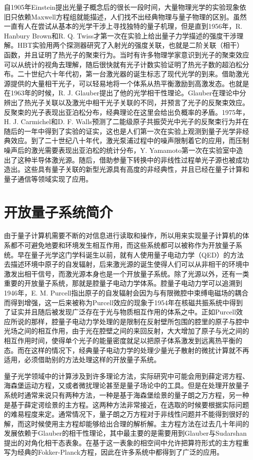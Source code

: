 自1905年Einstein提出光量子概念后的很长一段时间，大量物理光学的实验现象依旧只依赖Maxwell方程组就能描述，人们找不出经典物理与量子物理的区别。虽然一直有人在尝试从基本的光学干涉上寻找独特的量子机理，但是直到1956年，R. Hanbury Brown和R. Q. Twiss才第一次在实验上给出量子力学描述的强度干涉理解。HBT实验用两个探测器研究了入射光的强度关联，也就是二阶关联（相干）函数，并且证明了热光子的聚束行为。当时有许多物理学家意识到光子的聚束效应可以从统计的视角去理解，随后很快就有光子计数实验证明了热光子数的超泊松分布。二十世纪六十年代初，第一台激光器的诞生标志了现代光学的到来。借助激光源提供的大量相干光子，可以轻易地将一个体系从热平衡激励到高激发态。也就是在1963年的时候，R. J. Glauber提出了他的光学相干性理论。Glauber在理论中分辨出了热光子关联以及激光中相干光子关联的不同，并预言了光子的反聚束效应。反聚束的光子表现出亚泊松分布，经典理论在这里会给出负概率的矛盾。1975年，H. J. Carmichel和D. F. Walls预测了二能级原子共振荧光中光子的反聚束行为并在随后的一年中得到了实验的证实，这也是人们第一次在实验上观测到量子光学非经典效应\cite{walls2007quantum}。到了二十世纪八十年代，激光泵浦过程中的噪声限制着它的应用，而压制噪声后的激光需要表现出亚泊松的统计分布，Y. Yamamoto第一次在实验室中造出了这种半导体激光源。随后，借助参量下转换中的非线性过程单光子源也被成功造出。这些具有量子关联的新型光源具有高度的非经典性，并且已经在量子计算和量子通信等领域实现了应用。

\section{开放量子系统简介}
由于量子计算机需要不断的对信息进行读取和操作，所以用来实现量子计算机的体系都不可避免地要和环境发生相互作用，而这些系统都可以被称作为开放量子系统。早在量子光学这门学科诞生以前，就有人使用量子电动力学（QED）的方法去描述环境中原子的自发辐射，后来激光源的诞生使得人们可以从非相干的环境中激发出相干信号，而激光源本身也是一个开放量子系统。除了光源以外，还有一类重要的开放量子系统，那就是腔量子电动力学体系。腔量子电动力学可以追溯到1946年，E. M. Purcell指出原子的自发辐射会因为与有限微腔中束缚电磁场的耦合而得到增强，这一后来被称为Purcell效应的现象于1954年在核磁共振系统中得到了证实并且随后被发现广泛存在于光与物质相互作用的体系之中。正如Purcell效应所说的那样，腔量子电动力学处理的是限制在反射壁所包围的腔里的原子与腔中光场之间的相互作用，由于光在腔壁之间的来回反射，大大增加了原子与光之间的相互作用时间，使得单个光子的能量密度就足以把原子体系激发到远离热平衡的态。而在这样的情况下，经典量子电动力学的处理少量光子散射的微扰计算就不再适用，必须借助别的方法处理这样的开放量子系统。

量子光学领域中的计算涉及到许多理论方法，实际研究中可能会用到薛定谔方程、海森堡运动方程，又或者微扰理论甚至是量子场论中的工具。但是在处理开放量子系统时通常来说只有两种方法，一种是基于海森堡绘景的量子朗之万方程，另一种是基于薛定谔绘景的主方程\cite{carmichael1999statistical}。这两种方法非常接近，在选取的时候要根据实际问题的难易程度来定。通常情况下，量子朗之万方程对于非线性问题并不能得到很好的解，而这时候使用主方程却能够给出合理的解析解\cite{carmichael1999statistical}。主方程方法在过去几十年间的发展依赖于Glauber的相干性理论，其中最主要的是需要用到Glauber与Sudarshan提出的对角化相干态表象。在基于这一表象的相空间中允许把算符形式的主方程重写为经典的Fokker-Planck方程，因此在许多系统中都得到了广泛的应用。

